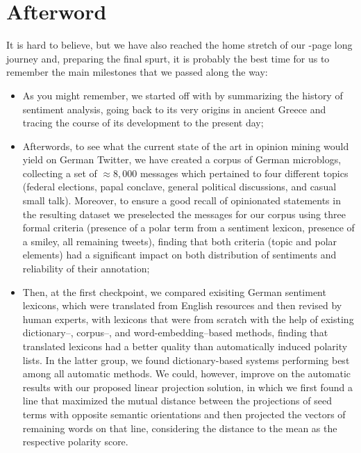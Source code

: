 \chapter*{Afterword}

It is hard to believe, but we have also reached the home stretch of
our \thepage-page long journey and, preparing the final spurt, it is
probably the best time for us to remember the main milestones that we
passed along the way:
\begin{itemize}
\item As you might remember, we started off with by summarizing the
  history of sentiment analysis, going back to its very origins in
  ancient Greece and tracing the course of its development to the
  present day;
\item Afterwords, to see what the current state of the art in opinion
  mining would yield on German Twitter, we have created a corpus of
  German microblogs, collecting a set of $\approx8,000$ messages which
  pertained to four different topics (federal elections, papal
  conclave, general political discussions, and casual small talk).
  Moreover, to ensure a good recall of opinionated statements in the
  resulting dataset we preselected the messages for our corpus using
  three formal criteria (presence of a polar term from a sentiment
  lexicon, presence of a smiley, all remaining tweets), finding that
  both criteria (topic and polar elements) had a significant impact on
  both distribution of sentiments and reliability of their annotation;
\item Then, at the first checkpoint, we compared exisiting German
  sentiment lexicons, which were translated from English resources and
  then revised by human experts, with lexicons that were from scratch
  with the help of existing dictionary--, corpus--, and
  word-embedding--based methods, finding that translated lexicons had
  a better quality than automatically induced polarity lists.  In the
  latter group, we found dictionary-based systems performing best
  among all automatic methods.  We could, however, improve on the
  automatic results with our proposed linear projection solution, in
  which we first found a line that maximized the mutual distance
  between the projections of seed terms with opposite semantic
  orientations and then projected the vectors of remaining words on
  that line, considering the distance to the mean as the respective
  polarity score.


\end{itemize}
